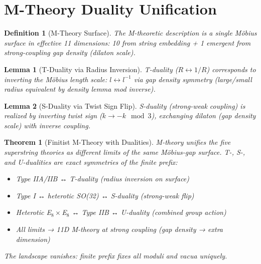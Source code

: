\documentclass[11pt]{article}
\newtheorem{theorem}{Theorem}[section]
\newtheorem{lemma}{Lemma}[section]
\newtheorem{definition}{Definition}[section]
\begin{document}
\section{M-Theory Duality Unification}

\begin{definition}[M-Theory Surface]
The M-theoretic description is a single Möbius surface in effective 11 dimensions: 10 from string embedding + 1 emergent from strong-coupling gap density (dilaton scale).
\end{definition}

\begin{lemma}[T-Duality via Radius Inversion]
T-duality ($R \leftrightarrow 1/R$) corresponds to inverting the Möbius length scale: $l \leftrightarrow l^{-1}$ via gap density symmetry (large/small radius equivalent by density lemma mod inverse).
\end{lemma}

\begin{lemma}[S-Duality via Twist Sign Flip]
S-duality (strong-weak coupling) is realized by inverting twist sign ($k \to -k \mod 3$), exchanging dilaton (gap density scale) with inverse coupling.
\end{lemma}

\begin{theorem}[Finitist M-Theory with Dualities]
M-theory unifies the five superstring theories as different limits of the same Möbius-gap surface. T-, S-, and U-dualities are exact symmetries of the finite prefix:
\begin{itemize}
    \item Type IIA/IIB ↔ T-duality (radius inversion on surface)
    \item Type I ↔ heterotic SO(32) ↔ S-duality (strong-weak flip)
    \item Heterotic E$_8\times$E$_8$ ↔ Type IIB ↔ U-duality (combined group action)
    \item All limits → 11D M-theory at strong coupling (gap density → extra dimension)
\end{itemize}
The landscape vanishes: finite prefix fixes all moduli and vacua uniquely.
\end{theorem}
\end{document}
